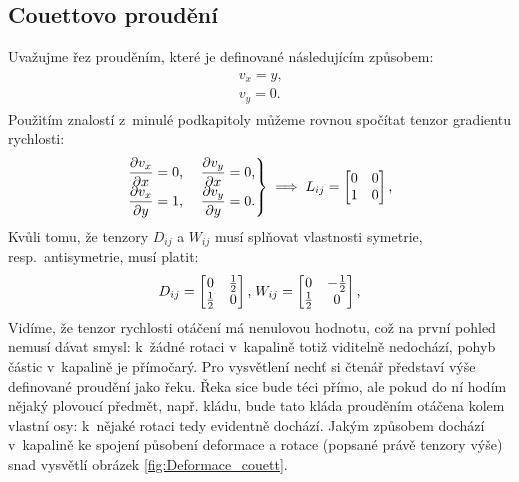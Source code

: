 \documentclass[12pt]{article}
\begin{document}
\subsection{Couettovo proudění}%

\label{sec:Couettovo_proudění}
Uvažujme řez prouděním, které je definované následujícím způsobem:
\begin{align}
    \begin{split}
        v_x = y\text{,}\\
        v_y = 0\text{.}
    \end{split}
\end{align}
Použitím znalostí z~minulé podkapitoly můžeme rovnou spočítat tenzor gradientu rychlosti:
\begin{equation}
    \begin{rcases}
        \begin{matrix}
            \dfrac{\partial v_x}{\partial x} = 0\text{,}& \;
            \dfrac{\partial v_y}{\partial x} = 0 \text{,}\\
            \dfrac{\partial v_x}{\partial y} = 1\text{,}& \;
            \dfrac{\partial v_y}{\partial y} = 0 \text{.}
        \end{matrix}
    \end{rcases}
    \;\Longrightarrow\;
    L_{ij} = 
    \begin{bmatrix}
        0 & 0 \\
        1 & 0
    \end{bmatrix}\text{,}\\
\end{equation}
Kvůli tomu, že tenzory $D_{ij}$ a $W_{ij}$ musí splňovat vlastnosti symetrie, resp.~antisymetrie, musí platit:
\begin{equation}
    D_{ij} = 
    \begin{bmatrix}
        0 & \frac{1}{2} \\
        \frac{1}{2} & 0
    \end{bmatrix}\text{,}\\
    \;W_{ij} = 
    \begin{bmatrix}
        0 & -\frac{1}{2} \\
        \frac{1}{2} & 0
    \end{bmatrix}\text{,}\\
\end{equation}
Vidíme, že tenzor rychlosti otáčení má nenulovou hodnotu, což na první pohled nemusí dávat smysl: k~žádné rotaci v~kapalině totiž viditelně nedochází, pohyb částic v~kapalině je přímočarý. Pro vysvětlení nechť si čtenář představí výše definované proudění jako řeku. Řeka sice bude téci přímo, ale pokud do ní hodím nějaký plovoucí předmět, např. kládu, bude tato kláda prouděním otáčena kolem vlastní osy: k~nějaké rotaci tedy evidentně dochází. Jakým způsobem dochází v~kapalině ke spojení působení deformace a rotace (popsané právě tenzory výše) snad vysvětlí obrázek \ref{fig:Deformace_couett}.
\end{document}

